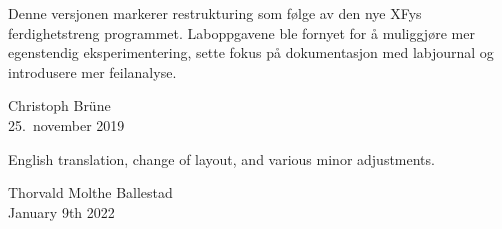 \documentclass[../Elmag-labhefte-2022.tex]{subfiles}
\begin{document}












\bigskip

Denne versjonen markerer restrukturing som følge av den nye XFys ferdighetstreng programmet. Laboppgavene ble fornyet for å muliggjøre mer egenstendig eksperimentering, sette fokus på dokumentasjon med labjournal og introdusere mer feilanalyse. 

\bigskip
\begin{flushright}
  Christoph Br\"une\\
  25.\ november 2019
\end{flushright}


English translation, change of layout, and various minor adjustments.

\bigskip
\begin{flushright}
  Thorvald Molthe Ballestad\\
  January 9th 2022
\end{flushright}
\end{document}
